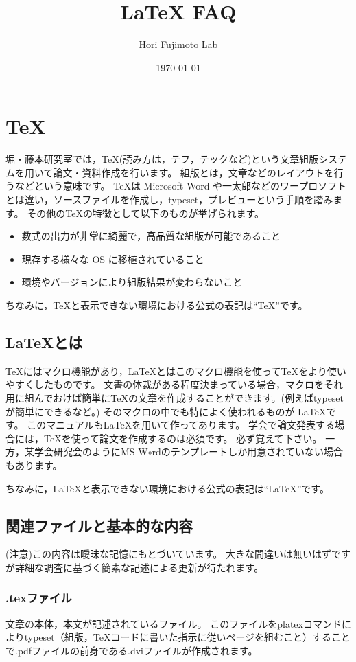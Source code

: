 \documentclass[10pt,a4paper,oneside,twocolumn,fleqn,dvipdfmx]{jsarticle}
\title{{\LaTeX} FAQ}
\author{Hori Fujimoto Lab}
\date{\today}
\begin{document}
\maketitle

\section{\TeX}
堀・藤本研究室では，\TeX (読み方は，テフ，テックなど)という文章組版システムを用いて論文・資料作成を行います。
組版とは，文章などのレイアウトを行うなどという意味です。
\TeX は Microsoft Word や一太郎などのワープロソフトとは違い，ソースファイルを作成し，typeset，プレビューという手順を踏みます。
その他の\TeX の特徴として以下のものが挙げられます。

\begin{itemize}
	\item  数式の出力が非常に綺麗で，高品質な組版が可能であること
	\item 現存する様々な OS に移植されていること
	\item 環境やバージョンにより組版結果が変わらないこと
\end{itemize}

ちなみに，\TeX と表示できない環境における公式の表記は``TeX''です。

\subsection{\LaTeX とは}
\TeX にはマクロ機能があり，\LaTeX とはこのマクロ機能を使って\TeX をより使いやすくしたものです。
文書の体裁がある程度決まっている場合，マクロをそれ用に組んでおけば簡単に\TeX の文章を作成することができます。(例えばtypesetが簡単にできるなど。)
そのマクロの中でも特によく使われるものが \LaTeX です。
このマニュアルも\LaTeX を用いて作ってあります。
学会で論文発表する場合には，\TeX を使って論文を作成するのは必須です。
必ず覚えて下さい。
一方，某学会研究会のようにMS W$\circ$rdのテンプレートしか用意されていない場合もあります。

ちなみに，\LaTeX と表示できない環境における公式の表記は``LaTeX''です。

\subsection{関連ファイルと基本的な内容}
(注意)この内容は曖昧な記憶にもとづいています。
大きな間違いは無いはずですが詳細な調査に基づく簡素な記述による更新が待たれます。

\subsubsection*{.texファイル}
文章の本体，本文が記述されているファイル。
このファイルをplatexコマンドによりtypeset（組版，\TeX コードに書いた指示に従いページを組むこと）することで.pdfファイルの前身である.dviファイルが作成されます。
\end{document}
